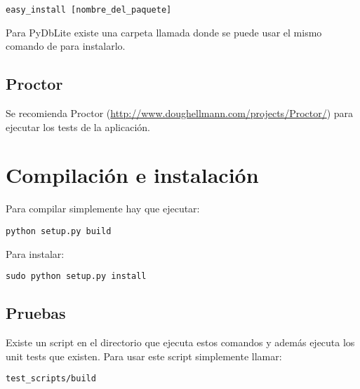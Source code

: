 \begin{verbatim}
easy_install [nombre_del_paquete]
\end{verbatim}

Para PyDbLite existe una carpeta llamada  donde se puede usar el mismo comando de  para instalarlo.

\subsection{Proctor}

Se recomienda Proctor (\url{http://www.doughellmann.com/projects/Proctor/}) para ejecutar los tests de la aplicación.

\section{Compilación e instalación}

Para compilar simplemente hay que ejecutar:

\begin{verbatim}
python setup.py build
\end{verbatim}

Para instalar:

\begin{verbatim}
sudo python setup.py install
\end{verbatim}

\subsection{Pruebas}

Existe un script en el directorio  que ejecuta estos comandos y además ejecuta los unit tests que existen. Para usar este script simplemente llamar:

\begin{verbatim}
test_scripts/build
\end{verbatim}



